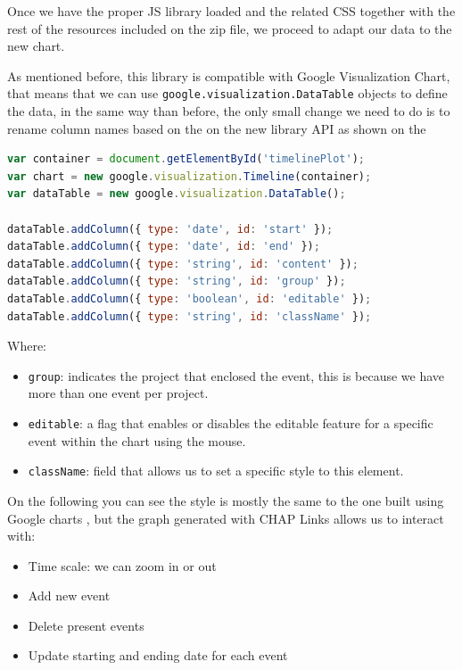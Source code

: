 Once we have the proper JS library loaded and the related CSS together with the
rest of the resources included on the zip file, we proceed to adapt our data to
the new chart.

As mentioned before, this library is compatible with Google Visualization
Chart, that means that we can use \texttt{google.visualization.DataTable}
objects to define the data, in the same way  than before, the only small change
we need to do is to rename column names based  on the on the new library API as
shown on the 

\begin{lstlisting}[language=Javascript,breaklines=true,caption=CHAP\ Link\
library,label=f_interactivetimelines_code]
var container = document.getElementById('timelinePlot');
var chart = new google.visualization.Timeline(container);
var dataTable = new google.visualization.DataTable();

dataTable.addColumn({ type: 'date', id: 'start' });
dataTable.addColumn({ type: 'date', id: 'end' });
dataTable.addColumn({ type: 'string', id: 'content' });
dataTable.addColumn({ type: 'string', id: 'group' });
dataTable.addColumn({ type: 'boolean', id: 'editable' });
dataTable.addColumn({ type: 'string', id: 'className' });
\end{lstlisting} 

Where:
\begin{itemize}
  \item \texttt{group}: indicates the project that enclosed the event, this is
  because we have more than one event per project.
  \item \texttt{editable}: a flag that enables or disables the editable feature
  for a specific event within the chart using the mouse.
  \item \texttt{className}: field that allows us to set a specific style to this
  element.
\end{itemize}

On the following  you can see the style is mostly the
same to the one built using Google charts \reffigure{f_timeline_google},
but the graph generated with CHAP Links allows us to interact with:
\begin{itemize}
  \item Time scale: we can zoom in or out
  \item Add new event
  \item Delete present events
  \item Update starting and ending date for each event
\end{itemize}

